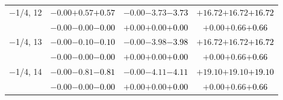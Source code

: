 \documentclass[compress]{beamer}
\begin{document}
\begin{frame}
\begin{tabular}{r | c | c | c}
$-$1/4, 12 & $-0.00$\hspace{0.1 cm}$+0.57$\hspace{0.1 cm}\textcolor{black}{$+0.57$} & $-0.00$\hspace{0.1 cm}$-3.73$\hspace{0.1 cm}\textcolor{black}{$-3.73$} & $+16.72$\hspace{0.1 cm}$+16.72$\hspace{0.1 cm}\textcolor{black}{$+16.72$} \\
           & $-0.00$\hspace{0.1 cm}$-0.00$\hspace{0.1 cm}\textcolor{black}{$-0.00$} & $+0.00$\hspace{0.1 cm}$+0.00$\hspace{0.1 cm}\textcolor{black}{$+0.00$} & $+0.00$\hspace{0.1 cm}$+0.66$\hspace{0.1 cm}\textcolor{black}{$+0.66$} \\
$-$1/4, 13 & $-0.00$\hspace{0.1 cm}$-0.10$\hspace{0.1 cm}\textcolor{black}{$-0.10$} & $-0.00$\hspace{0.1 cm}$-3.98$\hspace{0.1 cm}\textcolor{black}{$-3.98$} & $+16.72$\hspace{0.1 cm}$+16.72$\hspace{0.1 cm}\textcolor{black}{$+16.72$} \\
           & $-0.00$\hspace{0.1 cm}$-0.00$\hspace{0.1 cm}\textcolor{black}{$-0.00$} & $+0.00$\hspace{0.1 cm}$+0.00$\hspace{0.1 cm}\textcolor{black}{$+0.00$} & $+0.00$\hspace{0.1 cm}$+0.66$\hspace{0.1 cm}\textcolor{black}{$+0.66$} \\
$-$1/4, 14 & $-0.00$\hspace{0.1 cm}$-0.81$\hspace{0.1 cm}\textcolor{black}{$-0.81$} & $-0.00$\hspace{0.1 cm}$-4.11$\hspace{0.1 cm}\textcolor{black}{$-4.11$} & $+19.10$\hspace{0.1 cm}$+19.10$\hspace{0.1 cm}\textcolor{black}{$+19.10$} \\
           & $-0.00$\hspace{0.1 cm}$-0.00$\hspace{0.1 cm}\textcolor{black}{$-0.00$} & $+0.00$\hspace{0.1 cm}$+0.00$\hspace{0.1 cm}\textcolor{black}{$+0.00$} & $+0.00$\hspace{0.1 cm}$+0.66$\hspace{0.1 cm}\textcolor{black}{$+0.66$} \\

\end{tabular}
\end{frame}
\end{document}
